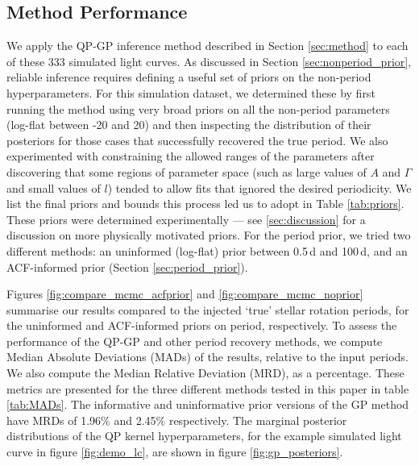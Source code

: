 \documentclass[useAMS, usenatbib, preprint, 12pt]{aastex}
\newcommand{\percentgpMADnp}{2.45}
\newcommand{\percentgpMAD}{1.96}
\newcommand{\vrcomment}[1]{{\color{magenta}#1}}
\begin{document}
\subsection{Method Performance}
\label{sec:performance}

We apply the QP-GP inference method described in Section \ref{sec:method}
to each of these 333 simulated light curves.  As discussed in Section
\ref{sec:nonperiod_prior}, reliable inference
requires defining a useful set of priors on the non-period
hyperparameters.
For this simulation dataset, we determined these by first running
the method using very broad priors on all the non-period parameters
(log-flat between -20 and 20)
and then inspecting the distribution of their posteriors for those cases
that successfully recovered the true period.
We also experimented with constraining the allowed ranges of the parameters
after discovering that some regions of parameter space (such as large values
of $A$ and $\Gamma$ and small values of $l$) tended to allow fits that ignored
the desired periodicity.
We list the final priors and bounds this process led us to adopt
in Table \ref{tab:priors}.
These priors were determined experimentally --- see \textsection
\ref{sec:discussion} for a discussion on more physically motivated priors.
For the period prior, we tried two different methods: an uninformed (log-flat)
prior between 0.5\,d and 100\,d, and an ACF-informed prior
(Section \ref{sec:period_prior}).

Figures \ref{fig:compare_mcmc_acfprior} and \ref{fig:compare_mcmc_noprior}
summarise our results compared to the injected
`true' stellar rotation periods, for the uninformed and ACF-informed priors on
period, respectively.
To assess the performance of the QP-GP and other period recovery
methods, we compute Median Absolute Deviations (MADs) of the results, relative
to the input periods.
We also compute the Median Relative Deviation (MRD), as a percentage.
These metrics are presented for the three different methods tested in this
paper in table \ref{tab:MADs}.
The informative and uninformative prior versions of the GP method have MRDs of
\percentgpMAD \% and \percentgpMADnp \% respectively.
The marginal posterior distributions of the QP kernel hyperparameters, for the
example simulated light curve in figure \ref{fig:demo_lc}, are shown in
figure \ref{fig:gp_posteriors}.
\end{document}
